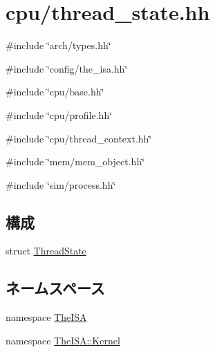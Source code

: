 \hypertarget{thread__state_8hh}{
\section{cpu/thread\_\-state.hh}
\label{thread__state_8hh}
}
{\ttfamily \#include \char`\"{}arch/types.hh\char`\"{}}\par
{\ttfamily \#include \char`\"{}config/the\_\-isa.hh\char`\"{}}\par
{\ttfamily \#include \char`\"{}cpu/base.hh\char`\"{}}\par
{\ttfamily \#include \char`\"{}cpu/profile.hh\char`\"{}}\par
{\ttfamily \#include \char`\"{}cpu/thread\_\-context.hh\char`\"{}}\par
{\ttfamily \#include \char`\"{}mem/mem\_\-object.hh\char`\"{}}\par
{\ttfamily \#include \char`\"{}sim/process.hh\char`\"{}}\par
\subsection*{構成}
\begin{DoxyCompactItemize}
\item 
struct \hyperlink{structThreadState}{ThreadState}
\end{DoxyCompactItemize}
\subsection*{ネームスペース}
\begin{DoxyCompactItemize}
\item 
namespace \hyperlink{namespaceTheISA}{TheISA}
\item 
namespace \hyperlink{namespaceTheISA_1_1Kernel}{TheISA::Kernel}
\end{DoxyCompactItemize}
